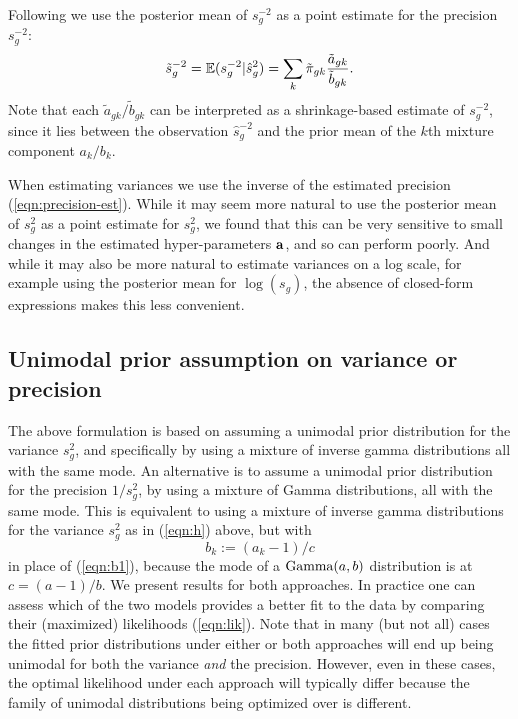\documentclass{bioinfo}
\begin{document}
\begin{methods}
Following \citet{smyth2004limma} we use the posterior mean of $s_g^{-2}$ as a point estimate for the precision $s_g^{-2}$:
\begin{equation} \label{eqn:precision-est}
\tilde{s}_g^{-2}=\mathbb{E}(s_g^{-2}|\hat{s}_g^2)=\sum_k \tilde{\pi}_{gk}\frac{\tilde{a}_{gk}}{\tilde{b}_{gk}}.
\end{equation}
Note that each ${\tilde{a}_{gk}}/{\tilde{b}_{gk}}$ can be interpreted as a shrinkage-based estimate of $s_g^{-2}$,
since it lies between the observation $\hat{s}_g^{-2}$ and the prior mean of the $k$th mixture component $a_k/b_k$.

When estimating variances we use the inverse of the estimated precision (\ref{eqn:precision-est}).
While it may seem more natural to use the posterior mean of $s_g^2$ as a point estimate for $s_g^2$, we found that this can be very sensitive
to small changes in the estimated hyper-parameters $\mathbf a$, and so can perform poorly.
And while it may also be more natural to estimate variances on a log scale, for example using the posterior mean for $\log(s_g)$,
the absence of closed-form expressions makes this less convenient.

\subsection{Unimodal prior assumption on variance or precision}

The above formulation is based on assuming a unimodal prior distribution for the variance $s_g^2$,
and specifically by using a mixture of inverse gamma distributions all with the same mode.
An alternative is to assume a unimodal prior distribution for the precision $1/s_g^2$,
by using a mixture of Gamma distributions, all with the same mode. 
This is equivalent to using a mixture
of inverse gamma distributions for the variance $s_g^2$ as in (\ref{eqn:h}) above, but with
\begin{equation}
b_k:= (a_k-1)/c \label{eqn:b2}
\end{equation}
in place of (\ref{eqn:b1}), because the mode of a $\textrm{Gamma}(a,b)$ distribution is at $c=(a-1)/b$.
We present results for both approaches. In practice one can assess which of the two models provides
a better fit to the data by comparing their (maximized) likelihoods (\ref{eqn:lik}).
 Note that in many (but not all) cases the fitted prior distributions under either or both approaches 
will end up being unimodal for both the variance {\it and} the precision. However, even in these cases,
the optimal likelihood under each approach will typically differ because the family of unimodal distributions 
being optimized over is different. 

\enlargethispage{6pt}

\end{methods}
\end{document}
